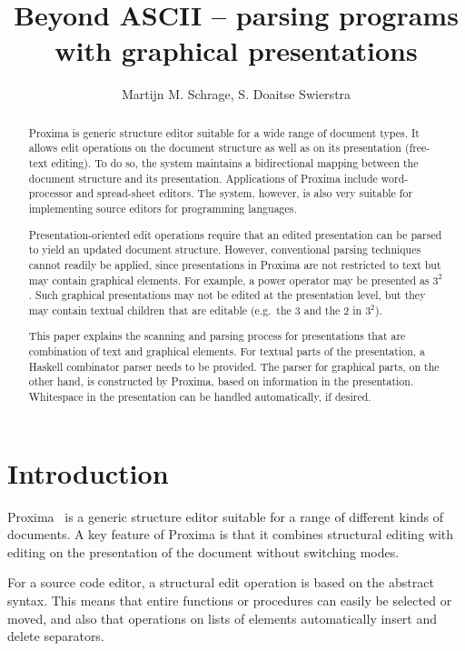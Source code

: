 \documentclass[12pt]{article}
\title{Beyond ASCII -- parsing programs with graphical presentations \\{\small \version}}
\author{Martijn M. Schrage\inst{1}, S. Doaitse Swierstra\inst{1}}
\begin{document}
 

\maketitle

\begin{abstract}

Proxima is generic structure editor suitable for a wide range of document types. It allows edit operations on the document structure as well as on its presentation (free-text editing). To do so, the system maintains a bidirectional mapping between the document structure and its presentation. Applications of Proxima include word-processor and spread-sheet editors. The system, however, is also very suitable for implementing source editors for programming languages.

Presentation-oriented edit operations require that an edited presentation can be parsed to yield an updated document structure. However, conventional parsing techniques cannot readily be applied, since presentations in Proxima are not restricted to text but may contain graphical elements. For example, a power operator may be presented as $3^2$. Such graphical presentations may not be edited at the presentation level, but they may contain textual children that are editable (e.g.\ the 3 and the 2 in $3^2$). 

This paper explains the scanning and parsing process for presentations that are combination of text and graphical elements. For textual parts of the presentation, a Haskell combinator parser needs to be provided. The parser for graphical parts, on the other hand, is constructed by Proxima, based on information in the presentation. Whitespace in the presentation can be handled automatically, if desired. 
\end{abstract}


\section{Introduction}

Proxima~\cite{schrage04Proxima} is a generic structure editor suitable for a range of different kinds of documents. A key feature of Proxima is that it combines structural editing with editing on the presentation of the document without switching modes. 


For a source code editor, a structural edit operation is based on the abstract syntax. This means that entire functions or procedures can easily be selected or moved, and also that operations on lists of elements automatically insert and delete separators.
\end{document}
